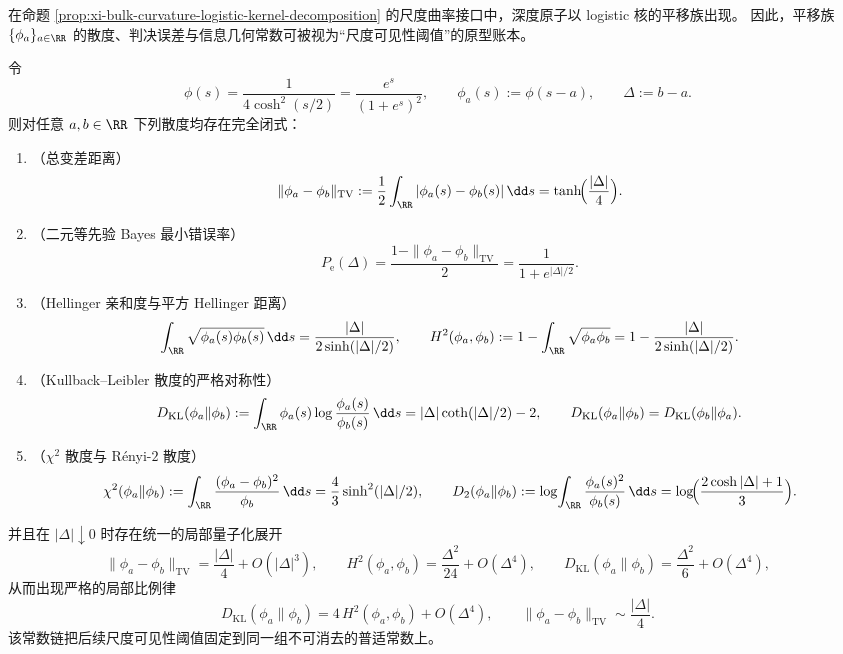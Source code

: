 %

在命题 \ref{prop:xi-bulk-curvature-logistic-kernel-decomposition} 的尺度曲率接口中，深度原子以 logistic 核的平移族出现。
因此，平移族 \(\{\phi_a\}_{a\in\RR}\) 的散度、判决误差与信息几何常数可被视为“尺度可见性阈值”的原型账本。

\begin{proposition}\label{prop:xi-logistic-divergence-dictionary}
令
\[
\phi(s)=\frac{1}{4\cosh^{2}(s/2)}=\frac{e^{s}}{(1+e^{s})^{2}},
\qquad
\phi_a(s):=\phi(s-a),
\qquad
\Delta:=b-a.
\]
则对任意 \(a,b\in\RR\) 下列散度均存在完全闭式：
\begin{enumerate}
  \item \textup{（总变差距离）}
  \[
  \|\phi_a-\phi_b\|_{\mathrm{TV}}
  :=\frac12\int_{\RR}|\phi_a(s)-\phi_b(s)|\,\dd s
  =\tanh\!\Bigl(\frac{|\Delta|}{4}\Bigr).
  \]
  \item \textup{（二元等先验 Bayes 最小错误率）}
  \[
  P_{\mathrm e}(\Delta)
  =\frac{1-\|\phi_a-\phi_b\|_{\mathrm{TV}}}{2}
  =\frac{1}{1+e^{|\Delta|/2}}.
  \]
  \item \textup{（Hellinger 亲和度与平方 Hellinger 距离）}
  \[
  \int_{\RR}\sqrt{\phi_a(s)\phi_b(s)}\,\dd s
  =\frac{|\Delta|}{2\sinh(|\Delta|/2)},
  \qquad
  H^{2}(\phi_a,\phi_b)
  :=1-\int_{\RR}\sqrt{\phi_a\phi_b}
  =1-\frac{|\Delta|}{2\sinh(|\Delta|/2)}.
  \]
  \item \textup{（Kullback--Leibler 散度的严格对称性）}
  \[
  D_{\mathrm{KL}}(\phi_a\|\phi_b)
  :=\int_{\RR}\phi_a(s)\log\frac{\phi_a(s)}{\phi_b(s)}\,\dd s
  =|\Delta|\coth(|\Delta|/2)-2,
  \qquad
  D_{\mathrm{KL}}(\phi_a\|\phi_b)=D_{\mathrm{KL}}(\phi_b\|\phi_a).
  \]
  \item \textup{（\(\chi^2\) 散度与 Rényi-\(2\) 散度）}
  \[
  \chi^2(\phi_a\|\phi_b)
  :=\int_{\RR}\frac{(\phi_a-\phi_b)^2}{\phi_b}\,\dd s
  =\frac{4}{3}\sinh^{2}(|\Delta|/2),
  \qquad
  D_2(\phi_a\|\phi_b)
  :=\log\!\int_{\RR}\frac{\phi_a(s)^2}{\phi_b(s)}\,\dd s
  =\log\!\Bigl(\frac{2\cosh|\Delta|+1}{3}\Bigr).
  \]
\end{enumerate}
并且在 \(|\Delta|\downarrow 0\) 时存在统一的局部量子化展开
\[
\|\phi_a-\phi_b\|_{\mathrm{TV}}=\frac{|\Delta|}{4}+O(|\Delta|^{3}),
\qquad
H^{2}(\phi_a,\phi_b)=\frac{\Delta^{2}}{24}+O(\Delta^{4}),
\qquad
D_{\mathrm{KL}}(\phi_a\|\phi_b)=\frac{\Delta^{2}}{6}+O(\Delta^{4}),
\]
从而出现严格的局部比例律
\[
D_{\mathrm{KL}}(\phi_a\|\phi_b)=4\,H^{2}(\phi_a,\phi_b)+O(\Delta^{4}),
\qquad
\|\phi_a-\phi_b\|_{\mathrm{TV}}\sim\frac{|\Delta|}{4}.
\]
该常数链把后续尺度可见性阈值固定到同一组不可消去的普适常数上。
\end{proposition}
